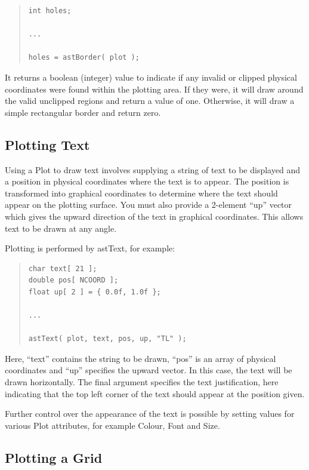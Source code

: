 \documentclass[twoside,11pt]{article}
\newcommand{\htmlref}[2]{#1}
\begin{document}
\begin{quote}
\small
\begin{verbatim}
int holes;

...

holes = astBorder( plot );
\end{verbatim}
\normalsize
\end{quote}

It returns a boolean (integer) value to indicate if any invalid or
clipped physical coordinates were found within the plotting area. If
they were, it will draw around the valid unclipped regions and return
a value of one.  Otherwise, it will draw a simple rectangular border
and return zero.

\subsection{Plotting Text}

Using a \htmlref{Plot}{Plot} to draw text involves supplying a string of text to be
displayed and a position in physical coordinates where the text is to
appear. The position is transformed into graphical coordinates to
determine where the text should appear on the plotting surface. You
must also provide a 2-element ``up'' vector which gives the upward
direction of the text in graphical coordinates. This allows text to be
drawn at any angle.

Plotting is performed by \htmlref{astText}{astText}, for example:

\begin{quote}
\small
\begin{verbatim}
char text[ 21 ];
double pos[ NCOORD ];
float up[ 2 ] = { 0.0f, 1.0f };

...

astText( plot, text, pos, up, "TL" );
\end{verbatim}
\normalsize
\end{quote}

Here, ``text'' contains the string to be drawn, ``pos'' is an array of
physical coordinates and ``up'' specifies the upward vector. In this
case, the text will be drawn horizontally. The final argument
specifies the text justification, here indicating that the top left
corner of the text should appear at the position given.

Further control over the appearance of the text is possible by setting
values for various Plot attributes, for example Colour, Font and Size.

\subsection{\label{ss:plottingagrid}Plotting a Grid}
\end{document}
